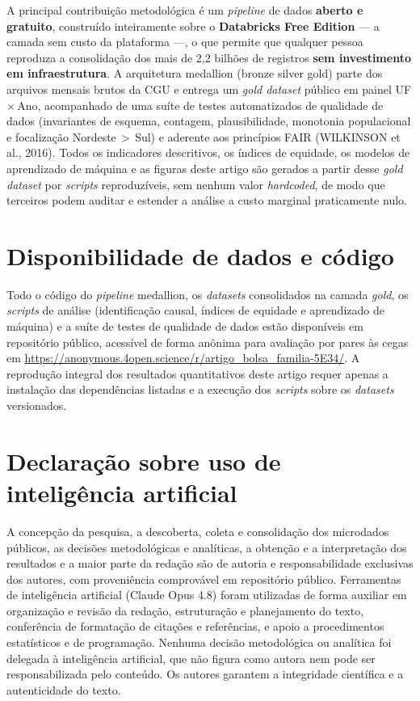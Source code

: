 \documentclass[12pt,a4paper,oneside]{article}
\begin{document}
A principal contribuição metodológica é um \textit{pipeline} de dados
\textbf{aberto e gratuito}, construído inteiramente sobre o
\textbf{Databricks Free Edition} --- a camada sem custo da plataforma ---,
o que permite que qualquer pessoa reproduza a consolidação dos mais de
2,2 bilhões de registros \textbf{sem investimento em infraestrutura}.
A arquitetura medallion (bronze \textrightarrow{} silver
\textrightarrow{} gold) parte dos arquivos mensais brutos da CGU e
entrega um \textit{gold dataset} público em painel UF\,$\times$\,Ano,
acompanhado de uma suíte de testes automatizados de qualidade de dados
(invariantes de esquema, contagem, plausibilidade, monotonia
populacional e focalização Nordeste\,$>$\,Sul) e aderente aos
princípios FAIR (WILKINSON et al., 2016). Todos os indicadores
descritivos, os índices de equidade, os modelos de aprendizado de
máquina e as figuras deste artigo são gerados a partir desse
\textit{gold dataset} por \textit{scripts} reproduzíveis, sem nenhum
valor \textit{hardcoded}, de modo que terceiros podem auditar e
estender a análise a custo marginal praticamente nulo.

\section*{Disponibilidade de dados e código}
\noindent Todo o código do \textit{pipeline} medallion, os \textit{datasets}
consolidados na camada \textit{gold}, os \textit{scripts} de análise
(identificação causal, índices de equidade e aprendizado de máquina) e a
suíte de testes de qualidade de dados estão disponíveis em repositório
público, acessível de forma anônima para avaliação por pares às cegas em
\url{https://anonymous.4open.science/r/artigo_bolsa_familia-5E34/}. A
reprodução integral dos resultados quantitativos deste artigo requer apenas
a instalação das dependências listadas e a execução dos \textit{scripts}
sobre os \textit{datasets} versionados.

\section*{Declaração sobre uso de inteligência artificial}
\noindent A concepção da pesquisa, a descoberta, coleta e consolidação dos microdados públicos, as decisões metodológicas e analíticas, a obtenção e a interpretação dos resultados e a maior parte da redação são de autoria e responsabilidade exclusivas dos autores, com proveniência comprovável em repositório público. Ferramentas de inteligência artificial (Claude Opus 4.8) foram utilizadas de forma auxiliar em organização e revisão da redação, estruturação e planejamento do texto, conferência de formatação de citações e referências, e apoio a procedimentos estatísticos e de programação. Nenhuma decisão metodológica ou analítica foi delegada à inteligência artificial, que não figura como autora nem pode ser responsabilizada pelo conteúdo. Os autores garantem a integridade científica e a autenticidade do texto.
\end{document}
